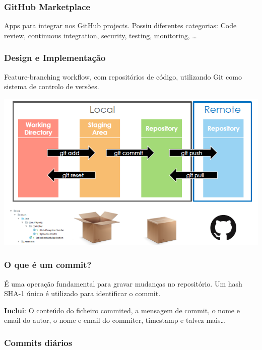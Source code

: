 \documentclass{article}
\begin{document}
\subsubsection*{GitHub Marketplace}

Apps para integrar nos GitHub projects. Possiu diferentes categorias:
Code review, continuous integration, security, testing, monitoring, \dots

\pagebreak

\subsubsection{Design e Implementação}

Feature-branching workflow, com repositórios de código,
utilizando Git como sistema de controlo de versões.

\begin{center}
  \includegraphics[scale=0.6]{48}
\end{center}

\subsubsection*{O que é um commit?}

É uma operação fundamental para gravar mudanças no repositório.
Um hash SHA-1 único é utilizado para identificar o commit.

\vspace{2mm}

\textbf{Inclui}: O conteúdo do ficheiro commited, a mensagem de commit, o
nome e email do autor, o nome e email do commiter, timestamp
e talvez mais\dots

\subsubsection*{Commits diários}
\end{document}
